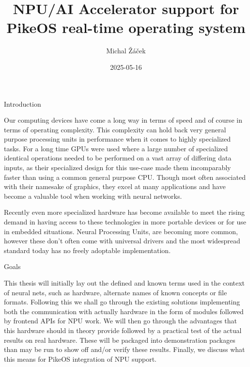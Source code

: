 \load[ctustyle3]
\worktype[B/EN]
\title{NPU/AI Accelerator support for PikeOS real-time operating system}
\author{Michal Žáček}
\date{2025-05-16}
\draft

\def\OpenVX{OpenVX™}
\def\VeriSilicon{VeriSilicon}
\def\NXP{NXP}
\def\textemdash{-}

\totf
\makefront

\chap Introduction

Our computing devices have come a long way in terms of speed
and of course in terms of operating complexity.
This complexity can hold back very general purpose processing units
in performance when it comes to highly specialized tasks.
For a long time GPUs were used where a large number
of specialized identical operations needed to be performed on
a vast array of differing data inputs,
as their specialized design for this use-case made them incomparably faster than
using a common general purpose CPU.
Though most often associated with their namesake of graphics,
they excel at many applications and have become a
valuable tool when working with neural networks.

Recently even more specialized hardware has become available
to meet the rising demand in having access to these technologies
in more portable devices or for use in embedded situations.
Neural Processing Units,
are becoming more common,
however these don't often come with universal drivers
and the most widespread standard today has no freely adoptable implementation.

\sec Goals

This thesis will initially lay out the defined and known terms used in the context of neural nets, such as hardware, alternate names of known concepts or file formats.
Following this we shall go through the existing solutions implementing both the communication with actually hardware in the form of modules followed by frontend APIs for NPU work.
We will then go through the advantages that this hardware should in theory provide followed by a practical test of the actual results on real hardware.
These will be packaged into demonstration packages than may be run to show off and/or verify these results.
Finally, we discuss what this means for PikeOS integration of NPU support.

